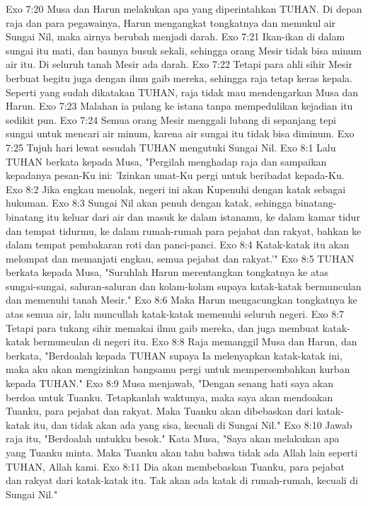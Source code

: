 Exo 7:20  Musa dan Harun melakukan apa yang diperintahkan TUHAN. Di depan raja dan para pegawainya, Harun mengangkat tongkatnya dan memukul air Sungai Nil, maka airnya berubah menjadi darah.
Exo 7:21  Ikan-ikan di dalam sungai itu mati, dan baunya busuk sekali, sehingga orang Mesir tidak bisa minum air itu. Di seluruh tanah Mesir ada darah.
Exo 7:22  Tetapi para ahli sihir Mesir berbuat begitu juga dengan ilmu gaib mereka, sehingga raja tetap keras kepala. Seperti yang sudah dikatakan TUHAN, raja tidak mau mendengarkan Musa dan Harun.
Exo 7:23  Malahan ia pulang ke istana tanpa mempedulikan kejadian itu sedikit pun.
Exo 7:24  Semua orang Mesir menggali lubang di sepanjang tepi sungai untuk mencari air minum, karena air sungai itu tidak bisa diminum.
Exo 7:25  Tujuh hari lewat sesudah TUHAN mengutuki Sungai Nil.
Exo 8:1  Lalu TUHAN berkata kepada Musa, "Pergilah menghadap raja dan sampaikan kepadanya pesan-Ku ini: 'Izinkan umat-Ku pergi untuk beribadat kepada-Ku.
Exo 8:2  Jika engkau menolak, negeri ini akan Kupenuhi dengan katak sebagai hukuman.
Exo 8:3  Sungai Nil akan penuh dengan katak, sehingga binatang-binatang itu keluar dari air dan masuk ke dalam istanamu, ke dalam kamar tidur dan tempat tidurmu, ke dalam rumah-rumah para pejabat dan rakyat, bahkan ke dalam tempat pembakaran roti dan panci-panci.
Exo 8:4  Katak-katak itu akan melompat dan memanjati engkau, semua pejabat dan rakyat.'"
Exo 8:5  TUHAN berkata kepada Musa, "Suruhlah Harun merentangkan tongkatnya ke atas sungai-sungai, saluran-saluran dan kolam-kolam supaya katak-katak bermunculan dan memenuhi tanah Mesir."
Exo 8:6  Maka Harun mengacungkan tongkatnya ke atas semua air, lalu muncullah katak-katak memenuhi seluruh negeri.
Exo 8:7  Tetapi para tukang sihir memakai ilmu gaib mereka, dan juga membuat katak-katak bermunculan di negeri itu.
Exo 8:8  Raja memanggil Musa dan Harun, dan berkata, "Berdoalah kepada TUHAN supaya Ia melenyapkan katak-katak ini, maka aku akan mengizinkan bangsamu pergi untuk mempersembahkan kurban kepada TUHAN."
Exo 8:9  Musa menjawab, "Dengan senang hati saya akan berdoa untuk Tuanku. Tetapkanlah waktunya, maka saya akan mendoakan Tuanku, para pejabat dan rakyat. Maka Tuanku akan dibebaskan dari katak-katak itu, dan tidak akan ada yang sisa, kecuali di Sungai Nil."
Exo 8:10  Jawab raja itu, "Berdoalah untukku besok." Kata Musa, "Saya akan melakukan apa yang Tuanku minta. Maka Tuanku akan tahu bahwa tidak ada Allah lain seperti TUHAN, Allah kami.
Exo 8:11  Dia akan membebaskan Tuanku, para pejabat dan rakyat dari katak-katak itu. Tak akan ada katak di rumah-rumah, kecuali di Sungai Nil."
